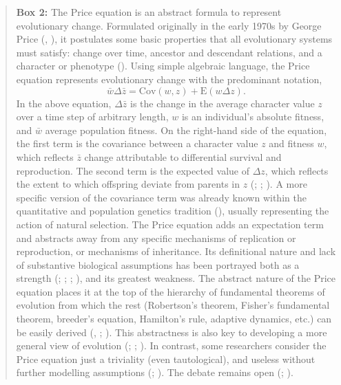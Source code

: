 \documentclass[
]{article}
\begin{document}
\begin{quote}
\textbf{Box 2:} The Price equation is an abstract formula to represent
evolutionary change. Formulated originally in the early 1970s by George
Price (,
), it postulates some basic properties
that all evolutionary systems must satisfy: change over time, ancestor
and descendant relations, and a character or phenotype
(). Using simple algebraic language,
the Price equation represents evolutionary change with the predominant
notation,
\[\bar{w}\Delta\bar{z} = \mathrm{Cov}\left(w, z\right) + \mathrm{E}\left(w\Delta z\right).\]
In the above equation, \(\Delta\bar{z}\) is the change in the average
character value \(z\) over a time step of arbitrary length, \(w\) is an
individual's absolute fitness, and \(\bar{w}\) average population
fitness. On the right-hand side of the equation, the first term is the
covariance between a character value \(z\) and fitness \(w\), which
reflects \(\bar{z}\) change attributable to differential survival and
reproduction. The second term is the expected value of \(\Delta z\),
which reflects the extent to which offspring deviate from parents in
\(z\) (;
; ). A more specific version of the covariance term was already known
within the quantitative and population genetics tradition
(), usually representing the
action of natural selection. The Price equation adds an expectation term
and abstracts away from any specific mechanisms of replication or
reproduction, or mechanisms of inheritance. Its definitional nature and
lack of substantive biological assumptions has been portrayed both as a
strength (;
; ; ), and its
greatest weakness. The abstract nature of the Price equation places it
at the top of the hierarchy of fundamental theorems of evolution from
which the rest (Robertson's theorem, Fisher's fundamental theorem,
breeder's equation, Hamilton's rule, adaptive dynamics, etc.) can be
easily derived (,
; ). This abstractness is also key to developing a more general view
of evolution (;
;
). In contrast, some
researchers consider the Price equation just a triviality (even
tautological), and useless without further modelling assumptions
(;
). The debate
remains open (;
).
\end{quote}
\end{document}
